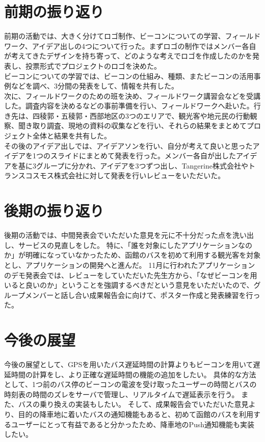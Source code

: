 \documentclass[openany,11pt,papersize]{jsbook}
\begin{document}
\section{前期の振り返り}
前期の活動では、大きく分けてロゴ制作、ビーコンについての学習、フィールドワーク、アイデア出しの4つについて行った。まずロゴの制作ではメンバー各自が考えてきたデザインを持ち寄って、どのような考えでロゴを作成したのかを発表し、投票形式でプロジェクトのロゴを決めた。\\
ビーコンについての学習では、ビーコンの仕組み、種類、またビーコンの活用事例などを調べ、3分間の発表をして、情報を共有した。\\
次に、フィールドワークのための班を決め、フィールドワーク講習会などを受講した。調査内容を決めるなどの事前準備を行い、フィールドワークへ赴いた。行き先は、四稜郭・五稜郭・西部地区の3つのエリアで、観光客や地元民の行動観察、聞き取り調査、現地の資料の収集などを行い、それらの結果をまとめてプロジェクト全体と結果を共有した。\\
その後のアイデア出しでは、アイデアソンを行い、自分が考えて良いと思ったアイデアを1つのスライドにまとめて発表を行った。メンバー各自が出したアイデアを基に3グループに分かれ、アイデアを3つずつ出し、Tangerine株式会社やトランスコスモス株式会社に対して発表を行いレビューをいただいた。


\section{後期の振り返り}
後期の活動では、中間発表会でいただいた意見を元に不十分だった点を洗い出し、サービスの見直しをした。
特に、「誰を対象にしたアプリケーションなのか」が明確になっていなかったため、函館のバスを初めて利用する観光客を対象とし、アプリケーションの開発へと進んだ。
11月に行われたアプリケーションのデモ発表会では、レビューをしていただいた先生方から、「なぜビーコンを用いると良いのか」ということを強調するべきだという意見をいただいたので、グループメンバーと話し合い成果報告会に向けて、ポスター作成と発表練習を行った。


\section{今後の展望}
今後の展望として、GPSを用いたバス遅延時間の計算よりもビーコンを用いて遅延時間の計算をし、より正確な遅延時間の機能の追加をしたい。
具体的な方法として、1つ前のバス停のビーコンの電波を受け取ったユーザーの時間とバスの時刻表の時間のズレをサーバで管理し、リアルタイムで遅延表示を行う。
また、バスの乗り換えの実装もしたい。
そして、成果報告会でいただいた意見より、目的の降車地に着いたバスの通知機能もあると、初めて函館のバスを利用するユーザーにとって有益であると分かったため、降車地のPush通知機能も実装したい。
\end{document}

